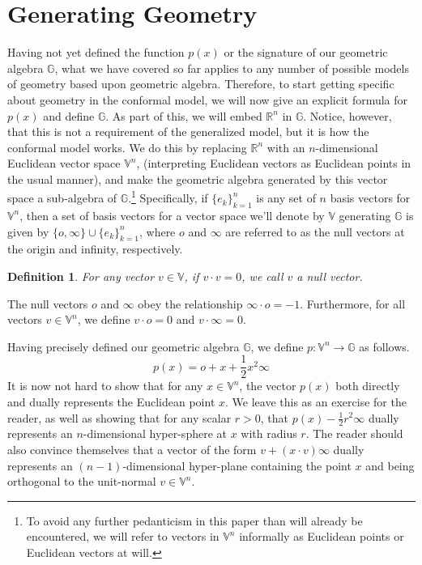 \documentclass[12pt]{article}
\newcommand{\G}{\mathbb{G}}
\newcommand{\V}{\mathbb{V}}
\newcommand{\R}{\mathbb{R}}
\newcommand{\nvao}{o}
\newcommand{\nvai}{\infty}
\newtheorem{definition}{Definition}[section]
\begin{document}
\section{Generating Geometry}

Having not yet defined the function $p(x)$ or the signature of our
geometric algebra $\G$, what we have covered so far applies to
any number of possible models of geometry based upon geometric algebra.
Therefore, to start getting specific about geometry in the conformal model,
we will now give an explicit formula for $p(x)$ and define $\G$.
As part of this, we will embed $\R^n$ in $\G$.  Notice, however, that
this is not a requirement of the generalized model, but it is how
the conformal model works.
We do this by replacing $\R^n$
with an $n$-dimensional Euclidean vector space $\V^n$, (interpreting
Euclidean vectors as Euclidean points in the usual manner), and
make the geometric algebra generated by this vector space
a sub-algebra of $\G$.\footnote{To avoid any further pedanticism in this paper than will already be encountered,
we will refer to vectors in $\V^n$ informally as Euclidean points or Euclidean vectors at will.}
Specifically, if $\{e_k\}_{k=1}^n$ is
any set of $n$ basis vectors for $\V^n$, then a set of
basis vectors for a vector space we'll denote by $\V$ generating $\G$
is given by $\{\nvao,\nvai\}\cup\{e_k\}_{k=1}^n$, where $\nvao$ and $\nvai$ are
referred to as the null vectors
at the origin and infinity, respectively.
\begin{definition}
For any vector $v\in\V$, if $v\cdot v=0$, we call $v$ a null vector.
\end{definition}
The null vectors $\nvao$ and $\nvai$ obey the relationship
$\nvai\cdot\nvao=-1$.  Furthermore, for
all vectors $v\in\V^n$, we define $v\cdot\nvao=0$ and $v\cdot\nvai=0$.

Having precisely defined our geometric algebra $\G$, we define
$p:\V^n\to\G$ as follows.
\begin{equation*}
p(x) = \nvao + x + \frac{1}{2}x^2\nvai
\end{equation*}
It is now not hard to show that for any $x\in\V^n$, the vector $p(x)$
both directly and dually represents the Euclidean point $x$.  We leave
this as an exercise
for the reader, as well as showing that for any scalar $r>0$, that
$p(x)-\frac{1}{2}r^2\nvai$ dually represents an $n$-dimensional hyper-sphere
at $x$ with radius $r$.  The reader should also convince themselves that a
vector of the form $v+(x\cdot v)\nvai$ dually represents an $(n-1)$-dimensional
hyper-plane containing the
point $x$ and being orthogonal to the unit-normal $v\in\V^n$.
\end{document}
